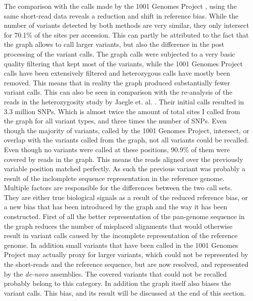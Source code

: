 The comparison with the calls made by the 1001 Genomes Project \citep{1001_Genomes_Consortium_Electronic_address_magnusnordborggmioeawacat2016-pn}, using the same short-read data reveals a reduction and shift in reference bias. While the number of variants detected by both methods are very similar, they only intersect for 70.1\% of the sites per accession. This can partly be attributed to the fact that the graph allows to call larger variants, but also the difference in the post processing of the variant calls. The graph calls were subjected to a very basic quality filtering that kept most of the variants, while the 1001 Genomes Project calls have been extensively filtered and heterozygous calls have mostly been removed. This means that in reality the graph produced substantially fewer variant calls. This can also be seen in comparison with the re-analysis of the reads in the heterozygosity study by Jaegle et. al. \citep{Jaegle2021-jw}. Their initial calls resulted in 3.3 million SNPs. Which is almost twice the amount of total sites I called from the graph for all variant types, and three times the number of SNPs. Even though the majority of variants, called by the 1001 Genomes Project, intersect, or overlap with the variants called from the graph, not all variants could be recalled. Even though no variants were called at these positions, 90.9\% of them were covered by reads in the graph. This means the reads aligned over the previously variable position matched perfectly. As such the previous variant was probably a result of the inclomplete sequence representation in the reference genome. \newline
Multiple factors are responsible for the differences between the two call sets. They are either true biological signals as a result of the reduced reference bias, or a new bias that has been introduced by the graph and the way it has been constructed. First of all the better representation of the pan-genome sequence in the graph reduces the number of misplaced alignments that would otherwise result in variant calls caused by the incomplete representation of the reference genome. In addition small variants that have been called in the 1001 Genomes Project may actually proxy for larger variants, which could not be represented by the short-reads and the reference sequence, but are now resolved, and represented by the \textit{de-novo} assemblies. The covered variants that could not be recalled probably belong to this category. In addition the graph itself also biases the variant calls. This bias, and its result will be discussed at the end of this section. \newline
